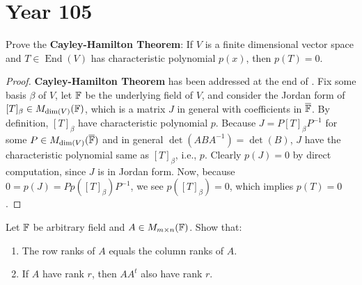 \documentclass{report}
\begin{document}
\section{Year 105}
\begin{question}{}{}
Prove the \textbf{Cayley-Hamilton Theorem}: If $V$ is a finite dimensional vector space and  $T \in \operatorname{End}(V)$ has characteristic polynomial $p(x)$, then $p(T)=0$. 
\end{question}
\begin{proof}
\textbf{Cayley-Hamilton Theorem} has been addressed at the end of . Fix some basis $\beta  $ of $V$, let $\mathbb{F}$ be the underlying field of  $V$, and consider  the Jordan form of $[T]_\beta  \in M_{\operatorname{dim}(V)}(\mathbb{F})$, which is a matrix $J$ in general with coefficients in $\overline{\mathbb{F}}$. By definition, $[T]_{\beta }$ have characteristic polynomial $p$. Because  $J=P[T]_{\beta }P^{-1}$ for some $P \in M_{\operatorname{dim}(V)}(\overline{\mathbb{F}})$ and in general  $\operatorname{det}(ABA^{-1})=\operatorname{det}(B)$, $J$ have the characteristic polynomial same as  $[T]_\beta $, i.e.,  $p$. Clearly $p(J)=0$ by direct computation, since $J$ is in Jordan form. Now, because $0=p(J)=Pp([T]_{\beta })P^{-1}$, we see $p([T]_{\beta })=0$, which implies $p(T)=0$. 
\end{proof}
\begin{question}{}{}
Let $\mathbb{F}$ be arbitrary field and  $A \in M_{m\times n}(\mathbb{F})$. Show that: 
\begin{enumerate}[label=(\roman*)]
  \item The row ranks of $A$ equals the column ranks of $A$.  
  \item If $A$ have rank  $r$, then  $AA^t$ also have rank  $r$. 
\end{enumerate}
\end{question}
\end{document}
